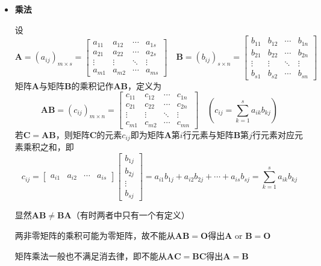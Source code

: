 \documentclass[UTF8]{ctexart}
\newcommand{\ve}[1]{{\bm{#1}}}
\newcommand{\mat}[1]{\ve{#1}}
\newcommand{\emplin}{\vspace{1em}}
\begin{document}
\begin{itemize}
  \item \textbf{乘法}

  设
  \[\mat{A}=(a_{ij})_{m\times s}=\begin{bmatrix}
  a_{11}&a_{12}&\cdots&a_{1s}\\
  a_{21}&a_{22}&\cdots&a_{2s}\\
  \vdots&\vdots&\ddots&\vdots\\
  a_{m1}&a_{m2}&\cdots&a_{ms}
  \end{bmatrix}\quad
  \mat{B}=(b_{ij})_{s\times n}=\begin{bmatrix}
  b_{11}&b_{12}&\cdots&b_{1n}\\
  b_{21}&b_{22}&\cdots&b_{2n}\\
  \vdots&\vdots&\ddots&\vdots\\
  b_{s1}&b_{s2}&\cdots&b_{sn}
  \end{bmatrix}\]
  矩阵$\mat{A}$与矩阵$\mat{B}$的乘积记作$\mat{A}\mat{B}$，定义为
  \[\mat{A}\mat{B}=(c_{ij})_{m\times n}=\begin{bmatrix}
  c_{11}&c_{12}&\cdots&c_{1n}\\
  c_{21}&c_{22}&\cdots&c_{2n}\\
  \vdots&\vdots&\ddots&\vdots\\
  c_{m1}&c_{m2}&\cdots&c_{mn}
  \end{bmatrix}\quad\left(
  c_{ij}=\sum_{k=1}^sa_{ik}b_{kj}
  \right)\]
  若$\mat{C}=\mat{A}\mat{B}$，则矩阵$\mat{C}$的元素$c_{ij}$即为矩阵$\mat{A}$第$i$行元素与矩阵$\mat{B}$第$j$行元素对应元素乘积之和，即
  \[c_{ij}=
  \begin{bmatrix}
    a_{i1} & a_{i2} & \cdots & a_{is}
  \end{bmatrix}
  \begin{bmatrix}
    b_{1j}\\
    b_{2j}\\
    \vdots\\
    b_{sj}
  \end{bmatrix}
  =a_{i1}b_{1j}+a_{i2}b_{2j}+\cdots+a_{is}b_{sj}
  =\sum_{k=1}^sa_{ik}b_{kj}
  \]

  \emplin

  显然$\mat{A}\mat{B}\ne\mat{B}\mat{A}$（有时两者中只有一个有定义）

  两非零矩阵的乘积可能为零矩阵，故不能从$\mat{A}\mat{B}=\mat{O}$得出$\mat{A}\text{ or }\mat{B}=\mat{O}$

  矩阵乘法一般也不满足消去律，即不能从$\mat{A}\mat{C}=\mat{B}\mat{C}$得出$\mat{A}=\mat{B}$

  \emplin


\end{itemize}
\end{document}
